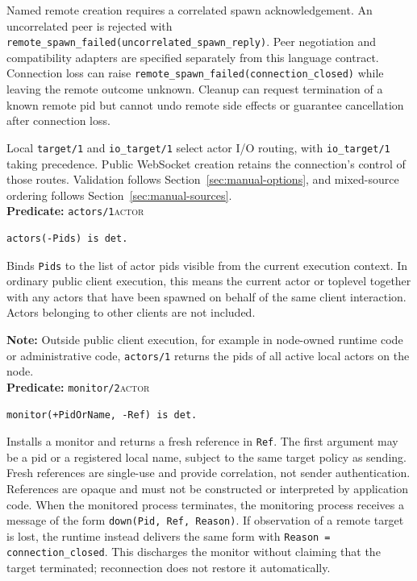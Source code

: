 Named remote creation requires a correlated spawn acknowledgement. An uncorrelated peer is rejected
with \texttt{remote\_\allowbreak{}spawn\_\allowbreak{}failed(\allowbreak{}uncorrelated\_\allowbreak{}spawn\_\allowbreak{}reply)}.
Peer negotiation and compatibility adapters are specified separately from this
language contract. Connection loss can raise \texttt{remote\_\allowbreak{}spawn\_\allowbreak{}failed(\allowbreak{}connection\_\allowbreak{}closed)} while
leaving the remote outcome unknown. Cleanup can request termination of a known remote pid but cannot
undo remote side effects or guarantee cancellation after connection loss.

Local \texttt{target/\allowbreak{}1} and \texttt{io\_\allowbreak{}target/\allowbreak{}1} select actor I/O
routing, with \texttt{io\_\allowbreak{}target/\allowbreak{}1} taking precedence. Public WebSocket creation
retains the connection's control of those routes. Validation follows
Section~\ref{sec:manual-options}, and mixed-source ordering follows
Section~\ref{sec:manual-sources}.\\


\noindent \textbf{Predicate:} \texttt{actors/\allowbreak{}1}\hfill\textsc{actor}

\begin{verbatim}
actors(-Pids) is det.
\end{verbatim}

\noindent Binds \texttt{Pids} to the list of actor pids visible from the
current execution context. In ordinary public client execution, this means the
current actor or toplevel together with any actors that have been spawned on
behalf of the same client interaction. Actors belonging to other clients are
not included.

\medskip
\noindent \textbf{Note:} Outside public client execution, for example in
node-owned runtime code or administrative code, \texttt{actors/\allowbreak{}1} returns the
pids of all active local actors on the node.\\


\noindent \textbf{Predicate:} \texttt{monitor/\allowbreak{}2}\hfill\textsc{actor}

\begin{verbatim}
monitor(+PidOrName, -Ref) is det.
\end{verbatim}

\noindent Installs a monitor and returns a fresh reference in \texttt{Ref}. The
first argument may be a pid or a registered local name, subject to the same
target policy as sending. Fresh references are single-use and provide
correlation, not sender authentication. References are opaque and must not
be constructed or interpreted by application code. When the monitored
process terminates, the monitoring process receives a message of the form
\texttt{down(\allowbreak{}Pid,\allowbreak{}\,\allowbreak{}Ref,\allowbreak{}\,\allowbreak{}Reason)}. If observation of a remote target is lost,
the runtime instead delivers the same form with
\texttt{Reason = connection\_\allowbreak{}closed}. This
discharges the monitor without claiming that the target terminated;
reconnection does not restore it automatically.

